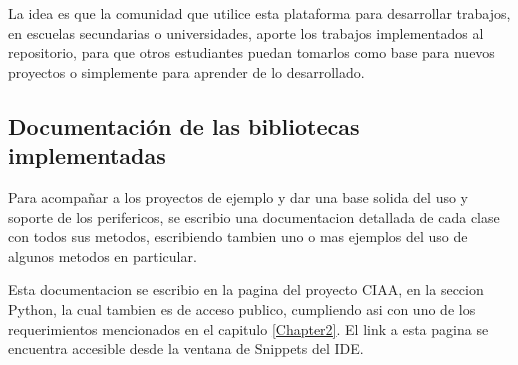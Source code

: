 La idea es que la comunidad que utilice esta plataforma para desarrollar trabajos, en escuelas secundarias o universidades, aporte los trabajos implementados al repositorio, para que otros estudiantes puedan tomarlos como base para nuevos proyectos o simplemente para aprender de lo desarrollado.

\subsection{Documentación de las bibliotecas implementadas} 

Para acompañar a los proyectos de ejemplo y dar una base solida del uso y soporte de los perifericos, se escribio una documentacion detallada de cada clase con todos sus metodos, escribiendo tambien uno o mas ejemplos del uso de algunos metodos en particular.

Esta documentacion se escribio en la pagina del proyecto CIAA, en la seccion Python\cite{bibpython}, la cual tambien es de acceso publico, cumpliendo asi con uno de los requerimientos mencionados en el capitulo \ref{Chapter2}. El link a esta pagina se encuentra accesible desde la ventana de Snippets del IDE.







